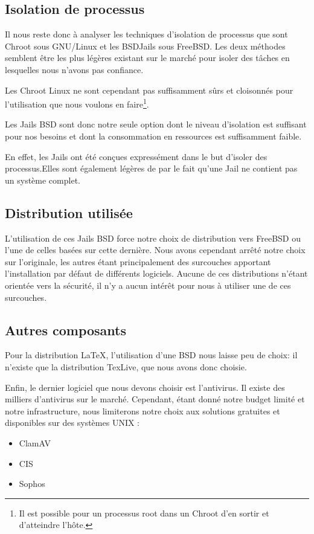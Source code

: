 \documentclass[10pt,a4paper]{article}
\begin{document}
\subsection{Isolation de processus}

Il nous reste donc à analyser les techniques d'isolation de processus que sont Chroot sous GNU/Linux et les BSDJails sous FreeBSD.
Les deux méthodes semblent être les plus légères existant sur le marché pour isoler des tâches en lesquelles nous n'avons pas confiance.

Les Chroot Linux ne sont cependant pas suffisamment sûrs et cloisonnés pour l'utilisation que nous voulons en faire\footnote{Il est possible pour un processus root dans un Chroot d'en sortir et d'atteindre l'hôte.}.

Les Jails BSD sont donc notre seule option dont le niveau d'isolation est suffisant pour nos besoins et dont la consommation en ressources est suffisamment faible.

En effet, les Jails ont été conçues expressément dans le but d'isoler des processus.Elles sont également légères de par le fait qu'une Jail ne contient pas un système complet.

\subsection{Distribution utilisée}

L'utilisation de ces Jails BSD force notre choix de distribution vers FreeBSD ou l'une de celles basées sur cette dernière. Nous avons cependant arrêté notre choix sur l'originale, les autres étant principalement des surcouches apportant l'installation par défaut de différents logiciels. Aucune de ces distributions n'étant orientée vers la sécurité, il n'y a aucun intérêt pour nous à utiliser une de ces surcouches.

\subsection{Autres composants}
\label{jail}

Pour la distribution \LaTeX, l'utilisation d'une BSD nous laisse peu de choix: il n'existe que la distribution TexLive, que nous avons donc choisie.

Enfin, le dernier logiciel que nous devons choisir est l'antivirus. Il existe des milliers d'antivirus sur le marché. Cependant, étant donné notre budget limité et notre infrastructure, nous limiterons notre choix aux solutions gratuites et disponibles sur des systèmes UNIX :
\begin{itemize}
    \item{ClamAV}
    \item{CIS}
    \item{Sophos}
\end{itemize}
\end{document}
